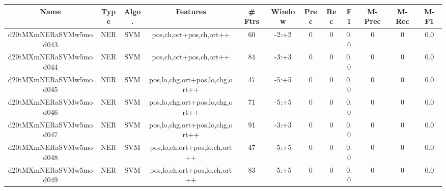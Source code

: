 \documentclass[a4paper]{article}
\begin{document}
\begin{landscape}
\begin{center}
\begin{tabular}{ |c|c|c|c|c|c|c|c|c|c|c|c|}
 \hline
\end{tabular}
\end{center}




\begin{center}
\begin{tabular}{ |c|c|c|c|c|c|c|c|c|c|c|c|} 
 \hline
 	Name & Type & Algo. & Features & \# Ftrs & Window & Prec & Rec & F1 & M-Prec & M-Rec & M-F1\\
 \hline

 	

 
 	
 	\small{ d20tMXmNERaSVMw5mod043 } & \small{ NER} & \small{  SVM }  & pos,ch,ort+pos,ch,ort++  &  60 &  \small{  -2:+2 }  &  0 & 0 & 0.0  &  0 & 0 & 0.0 \\
 	

 
 	
 	\small{ d20tMXmNERaSVMw5mod044 } & \small{ NER} & \small{  SVM }  & pos,ch,ort+pos,ch,ort++  &  84 &  \small{  -3:+3 }  &  0 & 0 & 0.0  &  0 & 0 & 0.0 \\
 	

 
 	
 	\small{ d20tMXmNERaSVMw5mod045 } & \small{ NER} & \small{  SVM }  & pos,lo,chg,ort+pos,lo,chg,ort++  &  47 &  \small{  -5:+5 }  &  0 & 0 & 0.0  &  0 & 0 & 0.0 \\
 	

 
 	
 	\small{ d20tMXmNERaSVMw5mod046 } & \small{ NER} & \small{  SVM }  & pos,lo,chg,ort+pos,lo,chg,ort++  &  71 &  \small{  -5:+5 }  &  0 & 0 & 0.0  &  0 & 0 & 0.0 \\
 	

 
 	
 	\small{ d20tMXmNERaSVMw5mod047 } & \small{ NER} & \small{  SVM }  & pos,lo,chg,ort+pos,lo,chg,ort++  &  91 &  \small{  -3:+3 }  &  0 & 0 & 0.0  &  0 & 0 & 0.0 \\
 	

 
 	
 	\small{ d20tMXmNERaSVMw5mod048 } & \small{ NER} & \small{  SVM }  & pos,lo,ch,ort+pos,lo,ch,ort++  &  47 &  \small{  -5:+5 }  &  0 & 0 & 0.0  &  0 & 0 & 0.0 \\
 	

 
 	
 	\small{ d20tMXmNERaSVMw5mod049 } & \small{ NER} & \small{  SVM }  & pos,lo,ch,ort+pos,lo,ch,ort++  &  83 &  \small{  -5:+5 }  &  0 & 0 & 0.0  &  0 & 0 & 0.0 \\
 	


\end{tabular}
\end{center}
\end{landscape}
\end{document}
